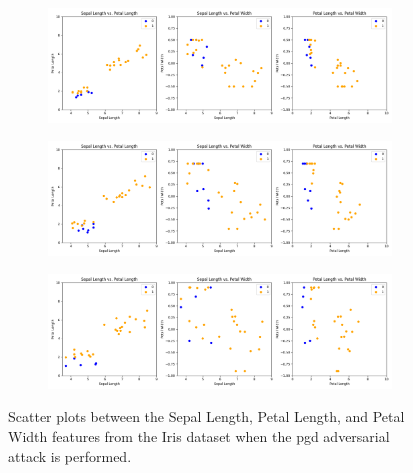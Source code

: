 \begin{figure}[!h]
  \ContinuedFloat
  \centering

  \begin{subfigure}{\textwidth}
    \includegraphics[width=\linewidth]{figures/adversarial_analysis/adversarial-pgd-0.5.png}
    \label{fig:adv8}
  \end{subfigure}

  \begin{subfigure}{\textwidth}
      \includegraphics[width=\linewidth]{figures/adversarial_analysis/adversarial-pgd-0.7.png}
      \label{fig:adv9}
  \end{subfigure}

  \begin{subfigure}{\textwidth}
    \includegraphics[width=\linewidth]{figures/adversarial_analysis/adversarial-pgd-0.9.png}
    \label{fig:adv10}
  \end{subfigure}

  \caption{Scatter plots between the Sepal Length, Petal Length, and Petal Width features from the Iris dataset when the \ac{pgd} adversarial attack is performed.}
  \label{fig:adv-pgd}
\end{figure} \

